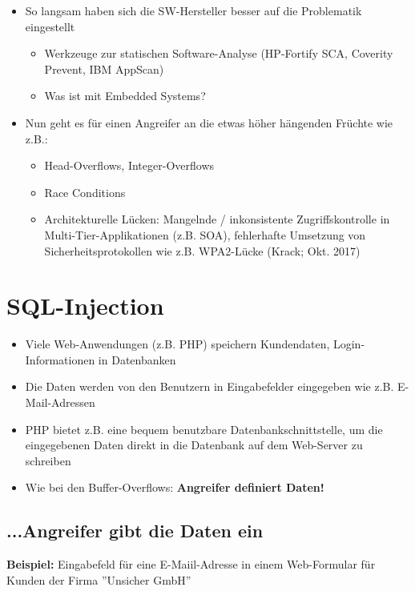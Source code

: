 \documentclass[openany]{book}
\begin{document}
\begin{itemize}
    \item So langsam haben sich die SW-Hersteller besser auf die Problematik eingestellt
    \begin{itemize}
        \item Werkzeuge zur statischen Software-Analyse (HP-Fortify SCA, Coverity Prevent, IBM AppScan)
        \item Was ist mit Embedded Systems?
    \end{itemize}
    \item Nun geht es für einen Angreifer an die etwas höher hängenden Früchte wie z.B.:
    \begin{itemize}
        \item Head-Overflows, Integer-Overflows
        \item Race Conditions
        \item Architekturelle Lücken: Mangelnde / inkonsistente Zugriffskontrolle in Multi-Tier-Applikationen (z.B. SOA), fehlerhafte Umsetzung von Sicherheitsprotokollen wie z.B. WPA2-Lücke (Krack; Okt. 2017)
    \end{itemize}
\end{itemize}

\section{SQL-Injection}

\begin{itemize}
    \item Viele Web-Anwendungen (z.B. PHP) speichern Kundendaten, Login-Informationen in Datenbanken
    \item Die Daten werden von den Benutzern in Eingabefelder eingegeben wie z.B. E-Mail-Adressen
    \item PHP bietet z.B. eine bequem benutzbare Datenbankschnittstelle, um die eingegebenen Daten direkt in die Datenbank auf dem Web-Server zu schreiben
    \item Wie bei den Buffer-Overflows: \textbf{Angreifer definiert Daten!}
\end{itemize}

\subsection{...Angreifer gibt die Daten ein}

\textbf{Beispiel:} Eingabefeld für eine E-Maiil-Adresse in einem Web-Formular für Kunden der Firma ''Unsicher GmbH''
\end{document}
